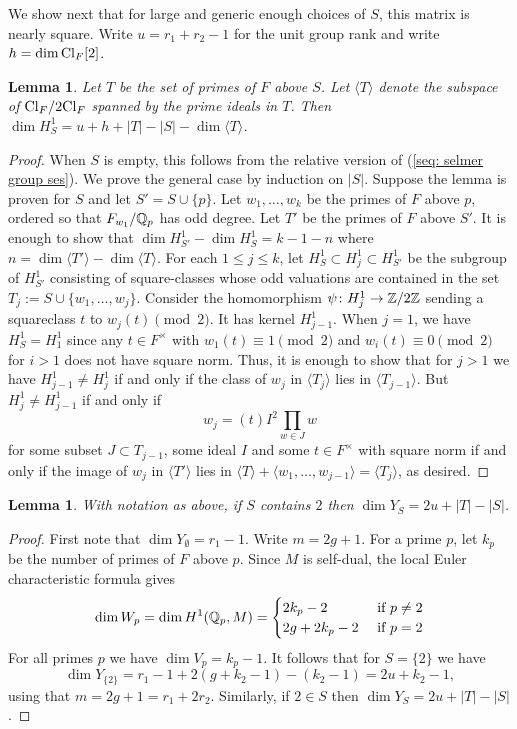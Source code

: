 \documentclass[11pt,a4paper]{amsart}
\def\Z{{\rm \mathbb{Z}}}
\def\Q{{\rm \mathbb{Q}}}
\def\Cl{{\rm Cl}}
\numberwithin{equation}{section}
\newtheorem{lemma}[theorem]{Lemma}
\begin{document}
We show next that for large and generic enough choices of $S$, this matrix is nearly square.  Write $u = r_1 + r_2 - 1$ for the unit group rank and write $h = \dim \Cl_{F}[2]$. 
\begin{lemma}
    Let $T$ be the set of primes of $F$ above $S$. Let $\langle T\rangle$ denote the subspace of $\Cl_F/2\Cl_F$ spanned by the prime ideals in $T$. Then $\dim H^1_S = u + h + |T| - |S| - \dim \langle T \rangle$. 
\end{lemma}
\begin{proof}
When $S$ is empty, this follows from the relative version of (\ref{seq: selmer group ses}). We prove the general case by induction on $|S|$. Suppose the lemma is proven for $S$ and let $S' = S\cup \{p\}$. Let $w_1,\ldots, w_k$ be the primes of $F$ above $p$, ordered so that $F_{w_1}/\Q_p$ has odd degree. Let $T'$ be the primes of $F$ above $S'$.  It is enough to show that $\dim H^1_{S'} - \dim H^1_S = k-1 - n$ where $n = \dim\langle T'\rangle - \dim \langle T \rangle$. For each $1 \leq j \leq k$, let $H^1_S \subset H^1_j \subset H^1_{S'}$ be the subgroup of $H^1_{S'}$ consisting of square-classes whose odd valuations are contained in the set $T_j:= S \cup \{w_1,\ldots, w_j\}$. Consider the homomorphism $\psi \colon H^1_j \to \Z/2\Z$ sending a squareclass $t$ to $w_j(t) \pmod{2}$. It has kernel $H^1_{j-1}$.
When $j = 1$, we have $H^1_S = H^1_1$ since any $t \in F^\times$ with $w_1(t) \equiv 1\pmod{2}$ and $w_i(t) \equiv 0\pmod{2}$ for $i > 1$ does not have square norm. Thus, it is enough to show that for $j > 1$ we have $H^1_{j-1} \neq H^1_j$ if and only if the class of $w_j$ in $\langle T_j\rangle$ lies in $\langle T_{j-1}\rangle$. But $H^1_j \neq  H^1_{j-1}$ if and only if \[w_j = (t)I^2\prod_{w \in J}w\] 
for some subset $J \subset T_{j-1}$, some ideal $I$ and some $t \in F^\times$ with square norm if and only if the image of $w_j$ in $\langle T' \rangle$ lies in $\langle T \rangle +\langle w_1,\ldots, w_{j-1}\rangle = \langle T_j\rangle$, as desired. 

\end{proof}

\begin{lemma}
With notation as above, if $S$ contains $2$ then $\dim Y_S = 2u + |T| - |S|$.    
\end{lemma}
\begin{proof}
    First note that $\dim Y_\emptyset = r_1 - 1$. Write $m = 2g + 1$.  For a prime $p$, let $k_p$ be the number of primes of $F$ above $p$. Since $M$ is self-dual, the local Euler characteristic formula gives \[\dim W_p = \dim H^1(\Q_p,M) = \begin{cases}
        2k_p - 2  & \mbox{ if } p \neq 2\\
        2g + 2k_p-2 & \mbox{  if } p = 2
    \end{cases}\]
    For all primes $p$ we have $\dim V_p = k_p - 1$. It follows that for $S = \{2\}$ we have
    \[ \dim Y_{\{2\}} = r_1 - 1 + 2(g + k_2 - 1) - (k_2-1) = 2u +k_2 - 1,\]
    using that $m = 2g + 1 = r_1 + 2r_2$.  Similarly, if $2 \in S$ then $\dim Y_S = 2u + |T| - |S|$.  
\end{proof}
\end{document}
